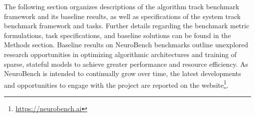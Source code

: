 The following section organizes descriptions of the algorithm track benchmark framework and its baseline results, as well as specifications of the system track benchmark framework and tasks. Further details regarding the benchmark metric formulations, task specifications, and baseline solutions can be found in the Methods section. Baseline results on NeuroBench benchmarks outline unexplored research opportunities in optimizing algorithmic architectures and training of sparse, stateful models to achieve greater performance and resource efficiency.
As NeuroBench is intended to continually grow over time, the latest developments and opportunities to engage with the project are reported on the website\footnote{\href{https://neurobench.ai}{https://neurobench.ai}}.